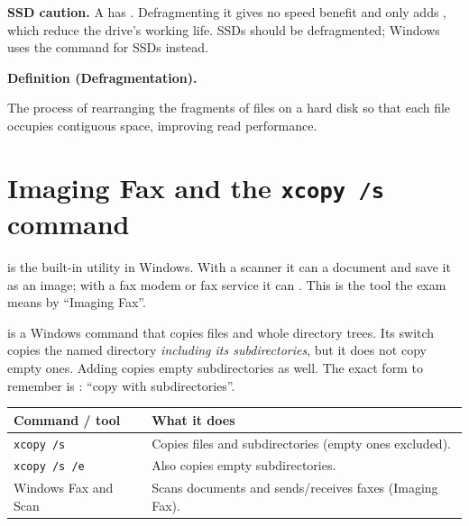 \documentclass[11pt]{article}
\newenvironment{definitionbox}[1]{%
  \par\noindent\textbf{Definition (#1).}\ \itshape
}{\par\vspace{0.3em}}
\begin{document}
\textbf{SSD caution.} A  has . Defragmenting it gives no speed benefit and only adds
, which reduce the drive's working life. SSDs should
 be defragmented; Windows uses the  command for SSDs
instead.

\begin{definitionbox}{Defragmentation}
The process of rearranging the fragments of files on a hard disk so that each
file occupies contiguous space, improving read performance.
\end{definitionbox}

\section{Imaging Fax and the \texttt{xcopy /s} command}
 is the built-in  utility in
Windows. With a scanner it can  a document and save it as an image;
with a fax modem or fax service it can . This is
the tool the exam means by ``Imaging Fax''.

 is a Windows  command that copies files and
whole directory trees. Its switch  copies the named directory
\emph{including its subdirectories}, but it does not copy empty ones. Adding
 copies empty subdirectories as well. The exact form to
remember is : ``copy with subdirectories''.

\begin{center}
\begin{tabular}{p{}p{}}
\toprule
\textbf{Command / tool} & \textbf{What it does} \\
\midrule
\texttt{xcopy /s} & Copies files and subdirectories (empty ones excluded). \\
\texttt{xcopy /s /e} & Also copies empty subdirectories. \\
Windows Fax and Scan & Scans documents and sends/receives faxes (Imaging Fax). \\
\bottomrule
\end{tabular}
\end{center}
\end{document}
